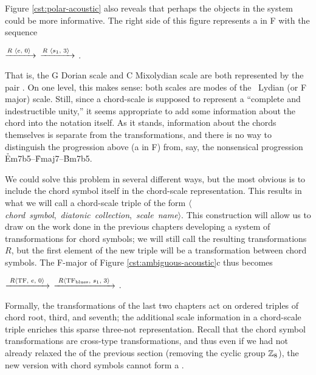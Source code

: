 Figure \ref{cst:polar-acoustic} also reveals that perhaps the objects in the
system could be more informative. The right side of this figure represents a
\tfo in F with the sequence \\
{ \centering
   $\xrightarrow{R\text{ \mbox{\ensuremath{\langle}$e$, $0$\ensuremath{\rangle}} }}$
   $\xrightarrow{R\text{ \mbox{\ensuremath{\langle}$s_1$, $3$\ensuremath{\rangle}} }}$
  .
  \par
}
\noindent That is, the G Dorian scale and C Mixolydian scale are both
represented by the pair . On one level, this makes
sense: both scales are modes of the \Bflat\ Lydian (or F major) scale. Still,
since a chord-scale is supposed to represent a ``complete and indestructible
unity,'' it seems appropriate to add some information about the chord into the
notation itself. As it stands, information about the chords themselves is
separate from the transformations, and there is no way to distinguish the
progression above (a \tfo in F) from, say, the nonsensical progression
\mbox{\h{Em7b5}--\h{Fmaj7}--\h{Bm7b5}}.

We could solve this problem in several different ways, but the most obvious is
to include the chord symbol itself in the chord-scale representation. This
results in what we will call a chord-scale triple of the form
\mbox{$\langle$\emph{chord symbol}, \emph{diatonic collection}, \emph{scale
    name}$\rangle$}. This construction will allow us to draw on the work done
in the previous chapters developing a system of transformations for chord
symbols; we will still call the resulting transformations $R$, but the first
element of the new triple will be a transformation between chord
symbols. The F-major \tfo of Figure \ref{cst:ambiguous-acoustic}c
thus becomes \\
{ \centering {}
  $\xrightarrow{\text{ \mbox{\ensuremath{R\langle}TF, $e$, $0$\ensuremath{\rangle}} }}$ 
  $\xrightarrow{\text{ \mbox{\ensuremath{R\langle}TF\textsubscript{blues}, $s_1$, $3$\ensuremath{\rangle}} }}$
  .
  \par
}
\noindent Formally, the transformations of the last two chapters act on
ordered triples of chord root, third, and seventh; the additional scale
information in a chord-scale triple enriches this sparse three-not
representation. Recall that the chord symbol transformations are
cross-type transformations, and thus even if we had not already relaxed the
\gis of the previous section (removing the cyclic group $\mathbb{Z}_8$), the new
version with chord symbols cannot form a \gis.

